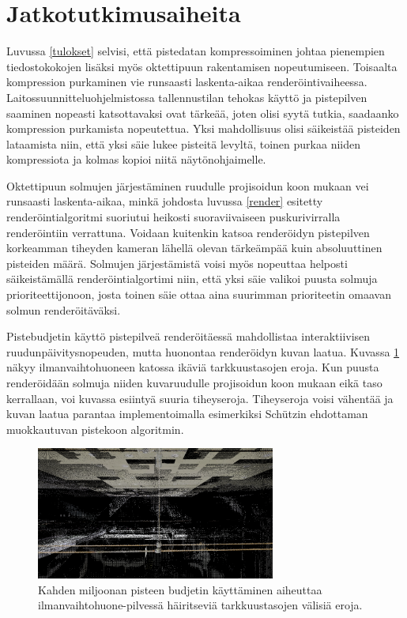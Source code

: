 \section{Jatkotutkimusaiheita}

Luvussa \ref{tulokset} selvisi, että pistedatan kompressoiminen johtaa pienempien tiedostokokojen lisäksi myös oktettipuun rakentamisen nopeutumiseen. Toisaalta kompression purkaminen vie runsaasti laskenta-aikaa renderöintivaiheessa. Laitossuunnitteluohjelmistossa tallennustilan tehokas käyttö ja pistepilven saaminen nopeasti katsottavaksi ovat tärkeää, joten olisi syytä tutkia, saadaanko kompression purkamista nopeutettua. Yksi mahdollisuus olisi säikeistää pisteiden lataamista niin, että yksi säie lukee pisteitä levyltä, toinen purkaa niiden kompressiota ja kolmas kopioi niitä näytönohjaimelle.

Oktettipuun solmujen järjestäminen ruudulle projisoidun koon mukaan vei runsaasti laskenta-aikaa, minkä johdosta luvussa \ref{render} esitetty renderöintialgoritmi suoriutui heikosti suoraviivaiseen puskurivirralla renderöintiin verrattuna. Voidaan kuitenkin katsoa renderöidyn pistepilven korkeamman tiheyden kameran lähellä olevan tärkeämpää kuin absoluuttinen pisteiden määrä. Solmujen järjestämistä voisi myös nopeuttaa helposti säikeistämällä renderöintialgortimi niin, että yksi säie valikoi puusta solmuja prioriteettijonoon, josta toinen säie ottaa aina suurimman prioriteetin omaavan solmun renderöitäväksi.

Pistebudjetin käyttö pistepilveä renderöitäessä mahdollistaa interaktiivisen ruudunpäivitysnopeuden, mutta huonontaa renderöidyn kuvan laatua. Kuvassa \ref{lod_border} näkyy ilmanvaihtohuoneen katossa ikäviä tarkkuustasojen eroja. Kun puusta renderöidään solmuja niiden kuvaruudulle projisoidun koon mukaan eikä taso kerrallaan, voi kuvassa esiintyä suuria tiheyseroja. Tiheyseroja voisi vähentää ja kuvan laatua parantaa implementoimalla esimerkiksi Schützin \cite{potree} ehdottaman muokkautuvan pistekoon algoritmin. 

\begin{figure}
    \centering
    \includegraphics[width=0.7\textwidth]{tuloksia/ilmastointi_2M/ilmastointihuone_vesijohto_overviewbuf.png}
    \caption{Kahden miljoonan pisteen budjetin käyttäminen aiheuttaa ilmanvaihtohuone-pilvessä häiritseviä tarkkuustasojen välisiä eroja.}
    \label{lod_border}
\end{figure}

